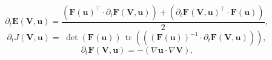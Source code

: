 \documentclass[preview]{standalone}
\let\oldcdot\cdot
\let\cdot\oldcdot
\begin{document}
\begin{dmath*}
\partial_{t} \mathbf E({\mathbf V},{\mathbf{ u }}) = \frac{\left(  \mathbf F({\mathbf{ u }})^\top  \cdot \partial_{t} \mathbf F({\mathbf V},{\mathbf{ u }}) \right) + \left(  \partial_{t} \mathbf F({\mathbf V},{\mathbf{ u }})^\top  \cdot \mathbf F({\mathbf{ u }}) \right)}{2},
 \end{dmath*}
\begin{dmath*}
\partial_{t} J({\mathbf V},{\mathbf{ u }}) =  \;\operatorname{det}(\mathbf F({\mathbf{ u }}))   \,\operatorname{tr}\left(\left(  (\mathbf F({\mathbf{ u }}))^{-1}  \cdot \partial_{t} \mathbf F({\mathbf V},{\mathbf{ u }}) \right)\right) ,
 \end{dmath*}
\begin{dmath*}
\partial_{t} \mathbf F({\mathbf V},{\mathbf{ u }}) = - \left(  \nabla {\mathbf{ u }}  \cdot  \nabla {\mathbf V}  \right).
 \end{dmath*}
\end{document}
